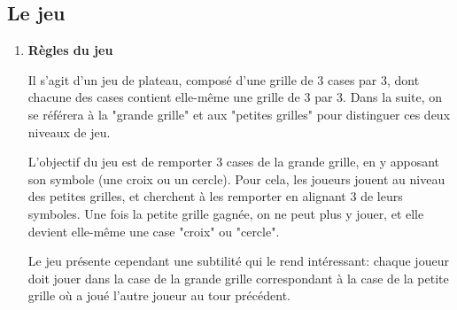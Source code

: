 \documentclass[10pt, french]{article}
\begin{document}
\paragraph{}



    
\subsection*{Le jeu}
\begin{enumerate}
    \item \textbf{Règles du jeu} 


\par Il s'agit d'un jeu de plateau, composé d'une grille de 3 cases par 3, dont chacune des cases contient elle-même une grille de 3 par 3. Dans la suite, on se référera à la "grande grille" et aux "petites grilles" pour distinguer ces deux niveaux de jeu.\\
\par L'objectif du jeu est de remporter 3 cases de la grande grille, en y apposant son symbole (une croix ou un cercle). Pour cela, les joueurs jouent au niveau des petites grilles, et cherchent à les remporter en alignant 3 de leurs symboles. Une fois la petite grille gagnée, on ne peut plus y jouer, et elle devient elle-même une case "croix" ou "cercle". \\
\par Le jeu présente cependant une subtilité qui le rend intéressant: chaque joueur doit jouer dans la case de la grande grille correspondant à la case de la petite grille où a joué l'autre joueur au tour précédent.





\end{enumerate}
\end{document}
